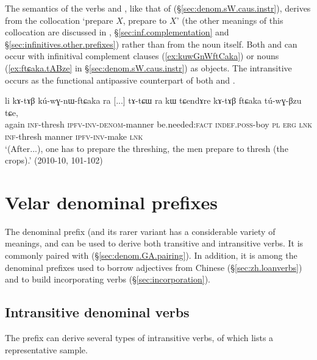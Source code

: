 The semantics of the verbs  and , like  that of  (§\ref{sec:denom.sW.caus.instr}), derives from the collocation  `prepare $X$, prepare to $X$' (the other meanings of this collocation are discussed in \citealt[240]{jacques16complementation}, §\ref{sec:inf.complementation}
and  §\ref{sec:infinitives.other.prefixes}) rather than from the noun  itself. Both   and  can occur with infinitival complement clauses (\ref{ex:kuwGnWftCaka}) or nouns (\ref{ex:ftɕaka.tABze} in §\ref{sec:denom.sW.caus.instr}) as objects. The intransitive  occurs as the functional antipassive counterpart of both  and .

\begin{exe}
\ex \label{ex:kuwGnWftCaka}
 \gll li kɤ-tɤβ kú-wɣ-nɯ-ftɕaka ra [...] tɤ-tɕɯ ra kɯ tɕendɤre kɤ-tɤβ ftɕaka tú-wɣ-βzu tɕe, \\
 again \textsc{inf}-thresh \textsc{ipfv}-\textsc{inv}-\textsc{denom}-manner be.needed:\textsc{fact} { } \textsc{indef}.\textsc{poss}-boy \textsc{pl} \textsc{erg} \textsc{lnk} \textsc{inf}-thresh manner \textsc{ipfv}-\textsc{inv}-make \textsc{lnk} \\
\glt `(After...), one has to prepare the threshing, the men prepare to thresh (the crops).' (2010-10, 101-102)
\end{exe}
 
\section{Velar denominal prefixes} \label{sec:denom.GW}
The  denominal prefix (and its rarer variant  has a considerable variety of meanings, and can be used to derive both transitive and intransitive verbs. It is commonly paired with  (§\ref{sec:denom.GA.pairing}). In addition, it is among the denominal prefixes used to borrow adjectives from Chinese (§\ref{sec:zh.loanverbs}) and to build incorporating verbs (§\ref{sec:incorporation}).

\subsection{Intransitive denominal verbs}  \label{sec:denom.intr.GA}
The  prefix can derive several types of intransitive verbs, of which  lists a representative sample.


